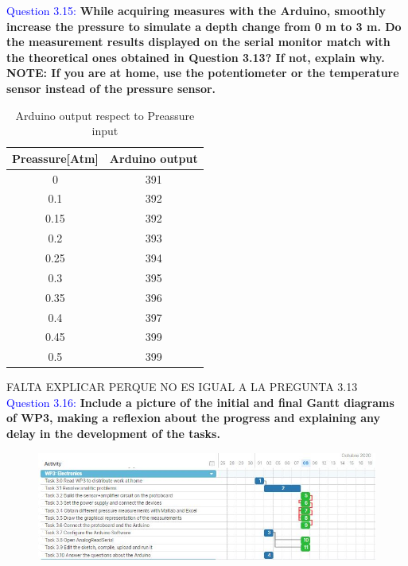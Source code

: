 \documentclass[12pt, a4papre]{article}
\begin{document}
	\textcolor{blue}{Question 3.15:}  \textbf{While acquiring measures with the Arduino, smoothly increase the pressure to simulate a depth change from 0 m to 3 m. Do the measurement results displayed on the serial monitor match with the theoretical ones obtained in Question 3.13? If not, explain why. NOTE: If you are at home, use the potentiometer or the temperature sensor instead of the pressure sensor.}

	\begin{table}[H]
	\centering
	\begin{tabular}{||c c ||} 
	 \hline
		 Preassure[Atm] & Arduino output \\ [0.5ex] 
	 \hline\hline
	 	 0 		& 391  \\
		 0.1 		& 392  \\ 
		 0.15 	& 392  \\ 
		 0.2 		& 393  \\
		 0.25 	& 394  \\ 
		 0.3 		& 395  \\
		 0.35 	& 396  \\ 
		 0.4 		& 397  \\
		 0.45 	& 399  \\ 
		 0.5 		& 399  \\ [1ex] 
	 \hline
	\end{tabular}
	\caption{Arduino output respect to Preassure input}
	\end{table}
	
	FALTA EXPLICAR PERQUE NO ES IGUAL A LA PREGUNTA 3.13\\

	\textcolor{blue}{Question 3.16:} \textbf{Include a picture of the initial and final Gantt diagrams of WP3, making a reflexion about the progress and explaining any delay in the development of the tasks. }
	
	\begin{figure}[H]
		\begin{center}
		\includegraphics[width=150mm]{WP3-8-10-2020.jpg}
		\end{center}
	\end{figure}
	
\end{document}
